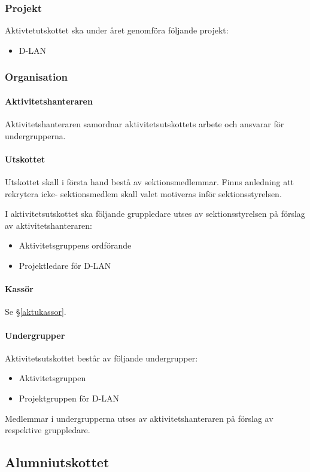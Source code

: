 \documentclass{datateknologsektionen-document}
\begin{document}
\subsubsection{Projekt}
Aktivtetutskottet ska under året genomföra följande projekt:
\begin{itemize}
  \item D-LAN
\end{itemize}
\subsubsection{Organisation}
\paragraph{Aktivitetshanteraren}
Aktivitetshanteraren samordnar aktivitetsutskottets arbete och ansvarar för undergrupperna.
\paragraph{Utskottet}

Utskottet skall i första hand bestå av sektionsmedlemmar. Finns anledning att rekrytera icke-
sektionsmedlem skall valet motiveras inför sektionsstyrelsen.

I aktivitetsutskottet ska följande gruppledare utses av sektionsstyrelsen på förslag
av aktivitetshanteraren:
\begin{itemize}
  \item Aktivitetsgruppens ordförande
  \item Projektledare för D-LAN
\end{itemize}

\paragraph{Kassör}
Se \S \ref{aktukassor}.

\paragraph{Undergrupper}
Aktivitetsutskottet består av följande undergrupper:
\begin{itemize}
  \item Aktivitetsgruppen
  \item Projektgruppen för D-LAN
\end{itemize}
Medlemmar i undergrupperna utses av aktivitetshanteraren på förslag av respektive gruppledare.

\subsection{Alumniutskottet}
\label{alumni}
\end{document}
